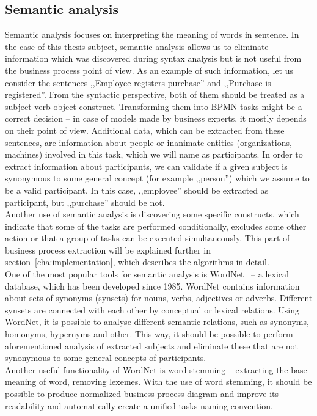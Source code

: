 \subsection{Semantic analysis}
\label{subsec:semantic-analysis}
Semantic analysis focuses on interpreting the meaning of words in sentence. In the case of this thesis subject, semantic analysis allows us to eliminate information which was discovered during syntax analysis but is not useful from the business process point of view. As an example of such information, let us consider the sentences ,,Employee registers purchase'' and ,,Purchase is registered''. From the syntactic perspective, both of them should be treated as a subject-verb-object construct. Transforming them into BPMN tasks might be a correct decision -- in case of models made by business experts, it mostly depends on their point of view. Additional data, which can be extracted from these sentences, are information about people or inanimate entities (organizations, machines) involved in this task, which we will name as participants. In order to extract information about participants, we can validate if a given subject is synonymous to some general concept (for example ,,person'') which we assume to be a valid participant. In this case, ,,employee'' should be extracted as participant, but ,,purchase'' should be not.\\
Another use of semantic analysis is discovering some specific constructs, which indicate that some of the tasks are performed conditionally, excludes some other action or that a group of tasks can be executed simultaneously. This part of business process extraction will be explained further in section~\ref{cha:implementation}, which describes the algorithms in detail.\\
One of the most popular tools for semantic analysis is WordNet~\cite{word-net} -- a lexical database, which has been developed since 1985. WordNet contains information about sets of synonyms (synsets) for nouns, verbs, adjectives or adverbs. Different synsets are connected with each other by conceptual or lexical relations. Using WordNet, it is possible to analyse different semantic relations, such as synonyms, homonyms, hypernyms and other. This way, it should be possible to perform aforementioned analysis of extracted subjects and eliminate these that are not synonymous to some general concepts of participants.\\
Another useful functionality of WordNet is word stemming -- extracting the base meaning of word, removing lexemes. With the use of word stemming, it should be possible to produce normalized business process diagram and improve its readability and automatically create a unified tasks naming convention.

